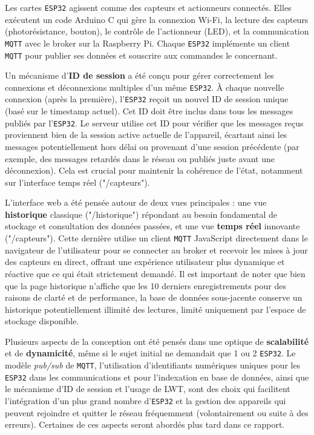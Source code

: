 \documentclass[12pt]{article}
\begin{document}
Les cartes \texttt{ESP32} agissent comme des capteurs et actionneurs connectés. Elles exécutent un code Arduino C qui gère la connexion Wi-Fi, la lecture des capteurs (photorésistance, bouton), le contrôle de l'actionneur (LED), et la communication \texttt{MQTT} avec le broker sur la Raspberry Pi. Chaque \texttt{ESP32} implémente un client \texttt{MQTT} pour publier ses données et souscrire aux commandes le concernant.

Un mécanisme d'\textbf{ID de session} a été conçu pour gérer correctement les connexions et déconnexions multiples d'un même \texttt{ESP32}. À chaque nouvelle connexion (après la première), l'\texttt{ESP32} reçoit un nouvel ID de session unique (basé sur le timestamp actuel). Cet ID doit être inclus dans tous les messages publiés par l'\texttt{ESP32}. Le serveur utilise cet ID pour vérifier que les messages reçus proviennent bien de la session active actuelle de l'appareil, écartant ainsi les messages potentiellement hors délai ou provenant d'une session précédente (par exemple, des messages retardés dans le réseau ou publiés juste avant une déconnexion). Cela est crucial pour maintenir la cohérence de l'état, notamment sur l'interface temps réel ("/capteurs").

L'interface web a été pensée autour de deux vues principales : une vue \textbf{historique} classique ("/historique") répondant au besoin fondamental de stockage et consultation des données passées, et une vue \textbf{temps réel} innovante ("/capteurs"). Cette dernière utilise un client \texttt{MQTT} JavaScript directement dans le navigateur de l'utilisateur pour se connecter au broker et recevoir les mises à jour des capteurs en direct, offrant une expérience utilisateur plus dynamique et réactive que ce qui était strictement demandé. Il est important de noter que bien que la page historique n'affiche que les 10 derniers enregistrements pour des raisons de clarté et de performance, la base de données sous-jacente conserve un historique potentiellement illimité des lectures, limité uniquement par l'espace de stockage disponible.

Plusieurs aspects de la conception ont été pensés dans une optique de \textbf{scalabilité} et de \textbf{dynamicité}, même si le sujet initial ne demandait que 1 ou 2 \texttt{ESP32}. Le modèle \textit{pub/sub} de \texttt{MQTT}, l'utilisation d'identifiants numériques uniques pour les \texttt{ESP32} dans les communications et pour l'indexation en base de données, ainsi que le mécanisme d'ID de session et l'usage de LWT, sont des choix qui facilitent l'intégration d'un plus grand nombre d'\texttt{ESP32} et la gestion des appareils qui peuvent rejoindre et quitter le réseau fréquemment (volontairement ou suite à des erreurs). Certaines de ces aspects seront abordés plus tard dans ce rapport.
\end{document}
